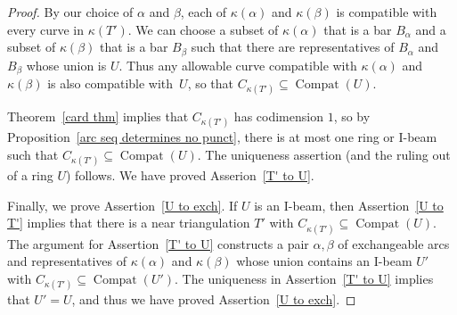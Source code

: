 \documentclass{amsart}
\theoremstyle{definition}
\theoremstyle{remark}
\numberwithin{equation}{section}
\newcommand{\0}{{\mathbf{0}}}
\newcommand{\Compat}{\operatorname{Compat}}
\begin{document}
\begin{proof}
By our choice of $\alpha$ and $\beta$, each of $\kappa(\alpha)$ and $\kappa(\beta)$ is compatible with every curve in $\kappa(T')$.
We can choose a subset of $\kappa(\alpha)$ that is a bar $B_\alpha$ and a subset of $\kappa(\beta)$ that is a bar $B_\beta$ such that there are representatives of $B_\alpha$ and $B_\beta$ whose union is $U$.
Thus any allowable curve compatible with $\kappa(\alpha)$ and $\kappa(\beta)$ is also compatible with~$U$, so that $C_{\kappa(T')}\subseteq\Compat(U)$.

Theorem~\ref{card thm} implies that $C_{\kappa(T')}$ has codimension $1$, so by Proposition~\ref{arc seq determines no punct}, there is at most one ring or I-beam such that $C_{\kappa(T')}\subseteq\Compat(U)$.
The uniqueness assertion (and the ruling out of a ring $U$) follows.
We have proved Asserion~\ref{T' to U}.

Finally, we prove Assertion~\ref{U to exch}.
If $U$ is an I-beam, then Assertion~\ref{U to T'} implies that there is a near triangulation $T'$ with $C_{\kappa(T')}\subseteq\Compat(U)$.
The argument for Assertion~\ref{T' to U} constructs a pair $\alpha,\beta$ of exchangeable arcs and representatives of $\kappa(\alpha)$ and $\kappa(\beta)$ whose union contains an I-beam $U'$ with $C_{\kappa(T')}\subseteq\Compat(U')$.
The uniqueness in Assertion~\ref{T' to U} implies that $U'=U$, and thus we have proved Assertion~\ref{U to exch}.
\end{proof}
\end{document}

